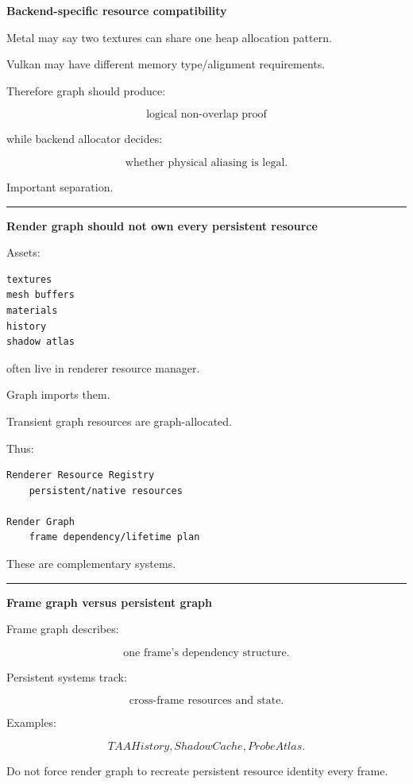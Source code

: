 \textbf{Backend-specific resource compatibility}

Metal may say two textures can share one heap allocation pattern.

Vulkan may have different memory type/alignment requirements.

Therefore graph should produce:

\[
\boxed{
\text{logical non-overlap proof}
}
\]

while backend allocator decides:

\[
\boxed{
\text{whether physical aliasing is legal}.
}
\]

Important separation.

\begin{center}\rule{0.5\linewidth}{0.5pt}\end{center}

\textbf{Render graph should not own every persistent resource}

Assets:

\begin{verbatim}
textures
mesh buffers
materials
history
shadow atlas
\end{verbatim}

often live in renderer resource manager.

Graph imports them.

Transient graph resources are graph-allocated.

Thus:

\begin{verbatim}
Renderer Resource Registry
    persistent/native resources

Render Graph
    frame dependency/lifetime plan
\end{verbatim}

These are complementary systems.

\begin{center}\rule{0.5\linewidth}{0.5pt}\end{center}

\textbf{Frame graph versus persistent graph}

Frame graph describes:

\[
\text{one frame's dependency structure}.
\]

Persistent systems track:

\[
\text{cross-frame resources and state}.
\]

Examples:

\[
TAAHistory,
ShadowCache,
ProbeAtlas.
\]

Do not force render graph to recreate persistent resource identity every frame.

